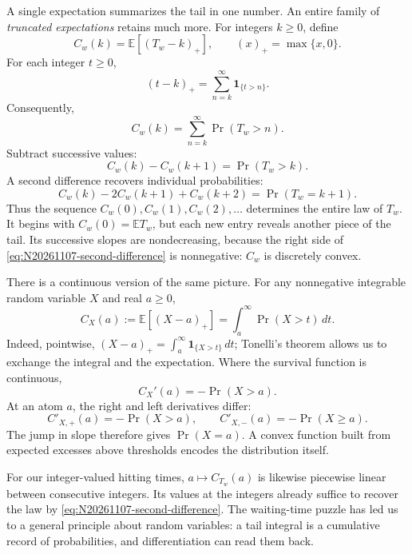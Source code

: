 A single expectation summarizes the tail in one number. An entire family of \emph{truncated expectations} retains much more. For integers \(k\geq0\), define
\[
 C_w(k)=\mathbb E[(T_w-k)_+],
 \qquad (x)_+=\max\{x,0\}.
\]
For each integer \(t\geq0\),
\[
 (t-k)_+=\sum_{n=k}^{\infty}\mathbf1_{\{t>n\}}.
\]
Consequently,
\begin{equation}
 C_w(k)=\sum_{n=k}^{\infty}\Pr(T_w>n).
 \label{eq:N20261107-stoploss}
\end{equation}
Subtract successive values:
\begin{equation}
 \boxed{\quad
 C_w(k)-C_w(k+1)=\Pr(T_w>k).\quad}
 \label{eq:N20261107-first-difference}
\end{equation}
A second difference recovers individual probabilities:
\begin{equation}
 \boxed{\quad
 C_w(k)-2C_w(k+1)+C_w(k+2)
 =\Pr(T_w=k+1).\quad}
 \label{eq:N20261107-second-difference}
\end{equation}
Thus the sequence \(C_w(0),C_w(1),C_w(2),\ldots\) determines the entire law of \(T_w\). It begins with \(C_w(0)=\mathbb ET_w\), but each new entry reveals another piece of the tail. Its successive slopes are nondecreasing, because the right side of \eqref{eq:N20261107-second-difference} is nonnegative: \(C_w\) is discretely convex.

There is a continuous version of the same picture. For any nonnegative integrable random variable \(X\) and real \(a\geq0\),
\begin{equation}
 C_X(a):=\mathbb E[(X-a)_+]
 =\int_a^\infty\Pr(X>t)\,dt.
 \label{eq:N20261107-continuous-stoploss}
\end{equation}
Indeed, pointwise,
\((X-a)_+=\int_a^\infty\mathbf1_{\{X>t\}}\,dt\);
Tonelli's theorem allows us to exchange the integral and the expectation. Where the survival function is continuous,
\[
 C_X'(a)=-\Pr(X>a).
\]
At an atom \(a\), the right and left derivatives differ:
\[
 C'_{X,+}(a)=-\Pr(X>a),\qquad
 C'_{X,-}(a)=-\Pr(X\geq a).
\]
The jump in slope therefore gives \(\Pr(X=a)\). A convex function built from expected excesses above thresholds encodes the distribution itself.



For our integer-valued hitting times, \(a\mapsto C_{T_w}(a)\) is likewise piecewise linear between consecutive integers. Its values at the integers already suffice to recover the law by \eqref{eq:N20261107-second-difference}. The waiting-time puzzle has led us to a general principle about random variables: a tail integral is a cumulative record of probabilities, and differentiation can read them back.

